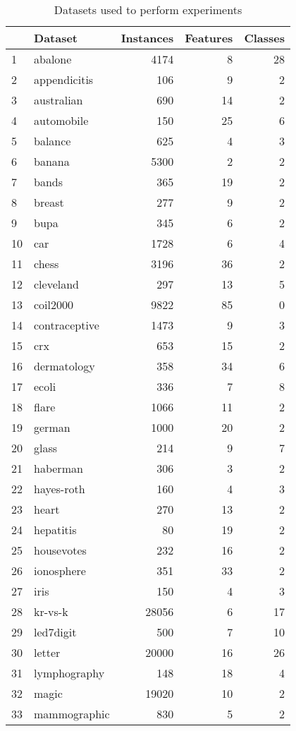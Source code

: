 \begin{table}
\footnotesize
\caption{Datasets used to perform experiments}
\label{tab:datasets}
\begin{tabular}{llrrr}
\hline
 & Dataset & Instances & Features & Classes \\
\hline
1 & abalone & 4174 & 8 & 28 \\
2 & appendicitis & 106 & 9 & 2 \\
3 & australian & 690 & 14 & 2 \\
4 & automobile & 150 & 25 & 6 \\
5 & balance & 625 & 4 & 3 \\
6 & banana & 5300 & 2 & 2 \\
7 & bands & 365 & 19 & 2 \\
8 & breast & 277 & 9 & 2 \\
9 & bupa & 345 & 6 & 2 \\
10 & car & 1728 & 6 & 4 \\
11 & chess & 3196 & 36 & 2 \\
12 & cleveland & 297 & 13 & 5 \\
13 & coil2000 & 9822 & 85 & 0 \\
14 & contraceptive & 1473 & 9 & 3 \\
15 & crx & 653 & 15 & 2 \\
16 & dermatology & 358 & 34 & 6 \\
17 & ecoli & 336 & 7 & 8 \\
18 & flare & 1066 & 11 & 2 \\
19 & german & 1000 & 20 & 2 \\
20 & glass & 214 & 9 & 7 \\
21 & haberman & 306 & 3 & 2 \\
22 & hayes-roth & 160 & 4 & 3 \\
23 & heart & 270 & 13 & 2 \\
24 & hepatitis & 80 & 19 & 2 \\
25 & housevotes & 232 & 16 & 2 \\
26 & ionosphere & 351 & 33 & 2 \\
27 & iris & 150 & 4 & 3 \\
28 & kr-vs-k & 28056 & 6 & 17 \\
29 & led7digit & 500 & 7 & 10 \\
30 & letter & 20000 & 16 & 26 \\
31 & lymphography & 148 & 18 & 4 \\
32 & magic & 19020 & 10 & 2 \\
33 & mammographic & 830 & 5 & 2 \\

\end{tabular}
\end{table}
